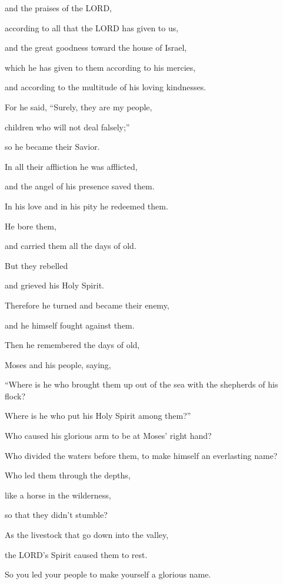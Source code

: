 and the praises of the LORD,

according to all that the LORD has given to us,

and the great goodness toward the house of Israel,

which he has given to them according to his mercies,

and according to the multitude of his loving kindnesses.

\myverse{}For he said, “Surely, they are my people,

children who will not deal falsely;”

so he became their Savior.

\myverse{}In all their affliction he was afflicted,

and the angel of his presence saved them.

In his love and in his pity he redeemed them.

He bore them,

and carried them all the days of old.


\vspace{\baselineskip} \myverse{}But they rebelled

and grieved his Holy Spirit.

Therefore he turned and became their enemy,

and he himself fought against them.


\vspace{\baselineskip} \myverse{}Then he remembered the days of old,

Moses and his people, saying,

“Where is he who brought them up out of the sea with the shepherds of his flock?

Where is he who put his Holy Spirit among them?”

\myverse{}Who caused his glorious arm to be at Moses’ right hand?

Who divided the waters before them, to make himself an everlasting name?

\myverse{}Who led them through the depths,

like a horse in the wilderness,

so that they didn’t stumble?

\myverse{}As the livestock that go down into the valley,

the LORD’s Spirit caused them to rest.

So you led your people to make yourself a glorious name.


